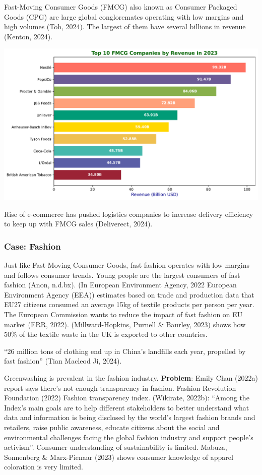 \documentclass[
  letterpaper,
  DIV=11,
  numbers=noendperiod]{scrartcl}
\begin{document}
Fast-Moving Consumer Goods (FMCG) also known as Consumer Packaged Goods
(CPG) are large global congloremates operating with low margins and high
volumes (Toh, 2024). The largest of them have several billions in
revenue (Kenton, 2024).

\includegraphics{_thesis_files/figure-pdf/cell-28-output-1.pdf}

Rise of e-commerce has pushed logistics companies to increase delivery
efficiency to keep up with FMCG sales (Deliverect, 2024).

\subsubsection{Case: Fashion}\label{case-fashion}

Just like Fast-Moving Consumer Goods, fast fashion operates with low
margins and follows consumer trends. Young people are the largest
consumers of fast fashion (Anon, n.d.bx). (In European Environment
Agency, 2022 European Environment Agency (EEA)) estimates based on trade
and production data that EU27 citizens consumed an average 15kg of
textile products per person per year. The European Commission wants to
reduce the impact of fast fashion on EU market (ERR, 2022).
(Millward-Hopkins, Purnell \& Baurley, 2023) shows how 50\% of the
textile waste in the UK is exported to other countries.

``26 million tons of clothing end up in China's landfills each year,
propelled by fast fashion'' (Tian Macleod Ji, 2024).

Greenwashing is prevalent in the fashion industry. \textbf{Problem}:
Emily Chan (2022a) report says there's not enough transparency in
fashion. Fashion Revolution Foundation (2022) Fashion transparency
index. (Wikirate, 2022b): ``Among the Index's main goals are to help
different stakeholders to better understand what data and information is
being disclosed by the world's largest fashion brands and retailers,
raise public awareness, educate citizens about the social and
environmental challenges facing the global fashion industry and support
people's activism''. Consumer understanding of sustainability is
limited. Mabuza, Sonnenberg \& Marx-Pienaar (2023) shows consumer
knowledge of apparel coloration is very limited.
\end{document}
